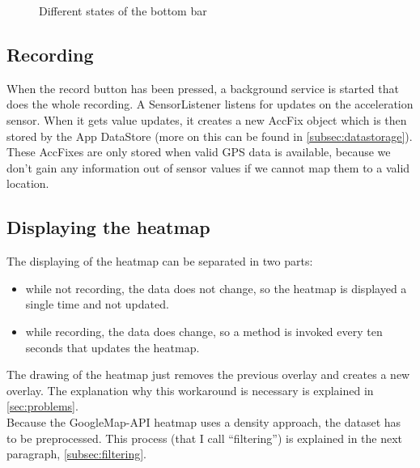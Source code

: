 \documentclass[10pt,a4paper]{article} %
\begin{document}
	\begin{figure}[H]
	  \centering
	  \hfill
	  \caption{Different states of the bottom bar}
	  \label{fig:bottom_bar}
	\end{figure}



	\subsection{Recording}

	When the record button has been pressed, a background service is started that does the whole recording.
	A SensorListener listens for updates on the acceleration sensor.
	When it gets value updates, it creates a new AccFix object which is then stored by the App DataStore (more on this can be found in \autoref{subsec:datastorage}).
	These AccFixes are only stored when valid GPS data is available, because we don't gain any information out of sensor values if we cannot map them to a valid location.
	
	
	\subsection{Displaying the heatmap}\label{subsec:displayheatmap}
	The displaying of the heatmap can be separated in two parts:

	\begin{itemize}
		\item while not recording, the data does not change, so the heatmap is displayed a single time and not updated.
		\item while recording, the data does change, so a method is invoked every ten seconds that updates the heatmap. 
	\end{itemize}

	The drawing of the heatmap just removes the previous overlay and creates a new overlay.
	The explanation why this workaround is necessary is explained in \autoref{sec:problems}.\\
	Because the GoogleMap-API heatmap uses a density approach, the dataset has to be preprocessed.
	This process (that I call ``filtering'') is explained in the next paragraph,  \autoref{subsec:filtering}.
	
\end{document}
